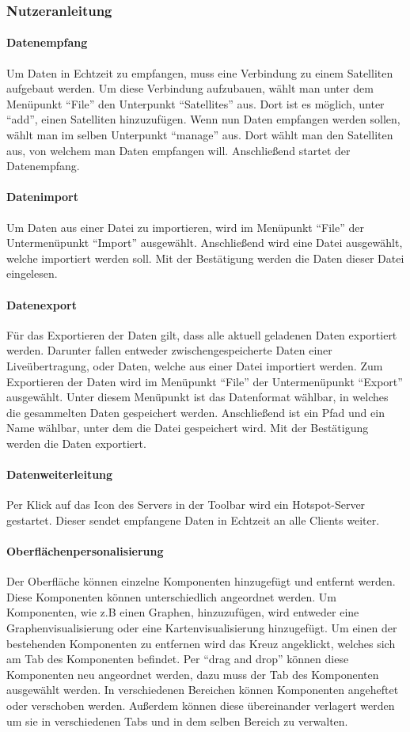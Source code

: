 \subsubsection{Nutzeranleitung}
\paragraph{Datenempfang}
Um Daten in Echtzeit zu empfangen, muss eine Verbindung zu einem Satelliten aufgebaut werden. Um diese Verbindung aufzubauen, wählt man unter dem Menüpunkt ``File'' den Unterpunkt ``Satellites'' aus. Dort ist es möglich, unter ``add'', einen Satelliten hinzuzufügen. Wenn nun Daten empfangen werden sollen, wählt man im selben Unterpunkt ``manage'' aus. Dort wählt man den Satelliten aus, von welchem man Daten empfangen will. Anschließend startet der Datenempfang.
\paragraph{Datenimport}
Um Daten aus einer Datei zu importieren, wird im Menüpunkt ``File'' der Untermenüpunkt ``Import'' ausgewählt. Anschließend wird eine Datei ausgewählt, welche importiert werden soll. Mit der Bestätigung werden die Daten dieser Datei eingelesen.
\paragraph{Datenexport}
Für das Exportieren der Daten gilt, dass alle aktuell geladenen Daten exportiert werden. Darunter fallen entweder zwischengespeicherte Daten einer Liveübertragung, oder Daten, welche aus einer Datei importiert werden.
Zum Exportieren der Daten wird im Menüpunkt ``File'' der Untermenüpunkt ``Export'' ausgewählt. Unter diesem Menüpunkt ist das Datenformat wählbar, in welches die gesammelten Daten gespeichert werden. Anschließend ist ein Pfad und ein Name wählbar, unter dem die Datei gespeichert wird. Mit der Bestätigung werden die Daten exportiert.
\paragraph{Datenweiterleitung}
Per Klick auf das Icon des Servers in der Toolbar wird ein Hotspot-Server gestartet. Dieser sendet empfangene Daten in Echtzeit an alle Clients weiter.
\paragraph{Oberflächenpersonalisierung}
Der Oberfläche können einzelne Komponenten hinzugefügt und entfernt werden. Diese Komponenten können unterschiedlich angeordnet werden. Um Komponenten, wie z.B einen Graphen, hinzuzufügen, wird entweder eine Graphenvisualisierung oder eine Kartenvisualisierung hinzugefügt. Um einen der bestehenden Komponenten zu entfernen wird das Kreuz angeklickt, welches sich am Tab des Komponenten befindet. Per ``drag and drop''  können diese Komponenten neu angeordnet werden, dazu muss der Tab des Komponenten ausgewählt werden. In verschiedenen Bereichen können Komponenten angeheftet oder verschoben werden. Außerdem können diese übereinander verlagert werden um sie in verschiedenen Tabs und in dem selben Bereich zu verwalten.

